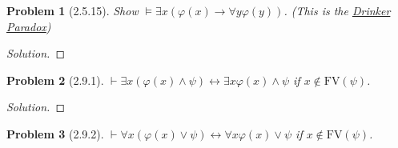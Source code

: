 \documentclass[letter]{article}
\newtheorem{problem}{Problem}
\theoremstyle{definition}
\newenvironment{solution}
{\begin{proof}[Solution]}
        {\end{proof}}
\renewcommand{\phi}{\varphi}
\begin{document}
\begin{problem}[2.5.15]
    Show $\models \exists x (\phi(x) \to \forall y \phi(y))$. (This is the \href{https://en.wikipedia.org/wiki/Drinker_paradox}{Drinker Paradox})
\end{problem}
\begin{solution}
\end{solution}

\begin{problem}[2.9.1]
    $\vdash \exists x (\phi(x) \land \psi) \leftrightarrow \exists x \phi(x) \land \psi$ if $x \notin \textrm{FV}(\psi)$.
\end{problem}
\begin{solution}
\end{solution}

\begin{problem}[2.9.2]
    $\vdash \forall x (\phi(x) \lor \psi) \leftrightarrow \forall x \phi(x) \lor \psi$ if $x \notin \textrm{FV}(\psi)$.
\end{problem}
\end{document}
